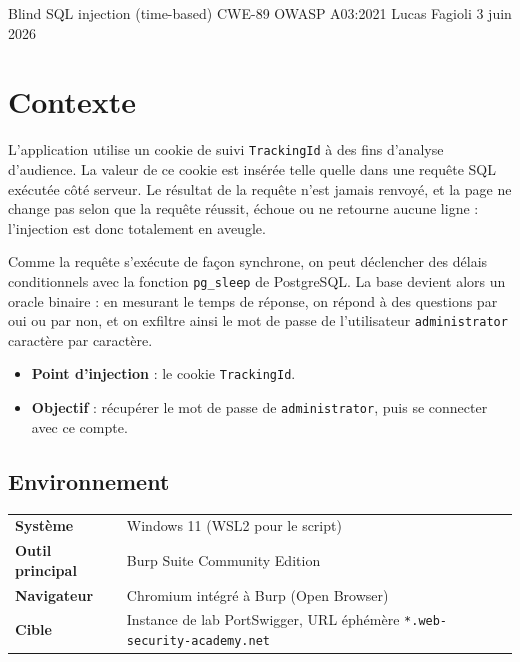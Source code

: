 \documentclass[11pt,a4paper]{article}
\begin{document}
\makecover
  {Blind SQL injection (time-based)}
  {CWE-89 \textperiodcentered{} OWASP A03\string:2021}
  {
  }
  {Lucas Fagioli}
  {3 juin 2026}

\section{Contexte}
L'application utilise un cookie de suivi \texttt{TrackingId} à des fins
d'analyse d'audience. La valeur de ce cookie est insérée telle quelle dans une
requête SQL exécutée côté serveur. Le résultat de la requête n'est jamais
renvoyé, et la page ne change pas selon que la requête réussit, échoue ou ne
retourne aucune ligne : l'injection est donc totalement en aveugle.

Comme la requête s'exécute de façon synchrone, on peut déclencher des délais
conditionnels avec la fonction \texttt{pg\_sleep} de PostgreSQL. La base
devient alors un oracle binaire : en mesurant le temps de réponse, on répond à
des questions par oui ou par non, et on exfiltre ainsi le mot de passe de
l'utilisateur \texttt{administrator} caractère par caractère.

\begin{itemize}
  \item \textbf{Point d'injection} : le cookie \texttt{TrackingId}.
  \item \textbf{Objectif} : récupérer le mot de passe de \texttt{administrator}, puis se connecter avec ce compte.
\end{itemize}

\subsection{Environnement}
\renewcommand{\arraystretch}{1.3}
\begin{tabular}{@{}p{}p{}@{}}
  \textbf{Système}        & Windows 11 (WSL2 pour le script) \\
  \textbf{Outil principal}& Burp Suite Community Edition \\
  \textbf{Navigateur}     & Chromium intégré à Burp (Open Browser) \\
  \textbf{Cible}          & Instance de lab PortSwigger, URL éphémère \texttt{*.web-security-academy.net} \\
\end{tabular}
\end{document}

